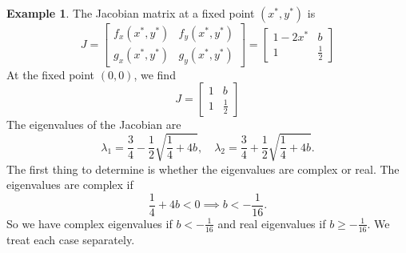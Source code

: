 \documentclass[reqno]{immbook}
\numberwithin{equation}{chapter}
\numberwithin{question}{section}
\numberwithin{theorem}{chapter}
\numberwithin{figure}{chapter}
\theoremstyle{definition}
\newtheorem{example}{Example}[section]
\begin{document}
\begin{example}
The Jacobian matrix 
at a fixed point $(x^*,y^*)$ is
\begin{equation}
   J = \begin{bmatrix}
          f_x(x^*,y^*) & f_y(x^*,y^*) \\
	  g_x(x^*,y^*) & g_y(x^*,y^*) 
       \end{bmatrix}
     = \begin{bmatrix}
          1-2x^* & b \\
	   1    & \frac{1}{2}
       \end{bmatrix}
\end{equation}
At the fixed point $(0,0)$, we find
\begin{equation}
  J = \begin{bmatrix}
          1 & b \\
	  1 & \frac{1}{2}
      \end{bmatrix}
\end{equation}
The eigenvalues of the Jacobian are
\begin{equation}
  \lambda_1 = \frac{3}{4} - \frac{1}{2} \sqrt{\frac{1}{4}+4b}, \quad
  \lambda_2 = \frac{3}{4} + \frac{1}{2} \sqrt{\frac{1}{4}+4b}.
\label{eqn:exeigvals}
\end{equation}
The first thing to determine is whether the eigenvalues are
complex or real.  The eigenvalues are complex if
\begin{equation}
  \frac{1}{4} + 4b < 0 \implies b < -\frac{1}{16}.
\end{equation}
So we have complex eigenvalues if $b < -\frac{1}{16}$ and real
eigenvalues if $b \ge -\frac{1}{16}$.
We treat each case separately.


\end{example}
\end{document}
